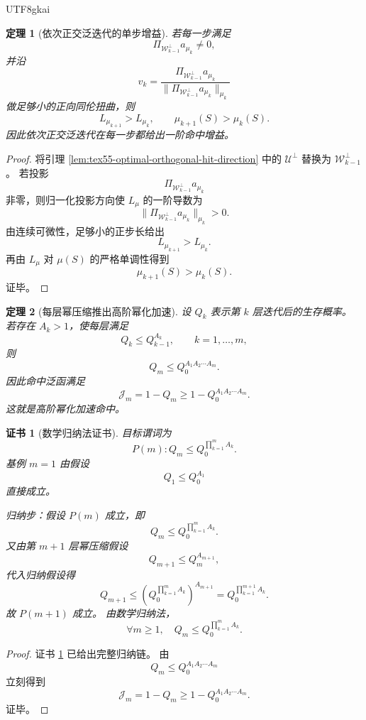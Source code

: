 \documentclass[12pt]{article}
\newtheorem{theorem}{定理}[section]
\newtheorem{Certificate}{证书}[section]
\begin{document}
\begin{CJK*}{UTF8}{gkai}
\begin{theorem}[依次正交泛迭代的单步增益]
\label{thm:tex55-sequential-orthogonal-gain}
若每一步满足
\[
  \Pi_{\mathcal W_{k-1}^\perp}a_{\mu_k}\neq0,
\]
并沿
\[
  v_k
  =
  \frac{
  \Pi_{\mathcal W_{k-1}^\perp}a_{\mu_k}
  }{
  \lVert\Pi_{\mathcal W_{k-1}^\perp}a_{\mu_k}\rVert_{\mu_k}
  }
\]
做足够小的正向同伦扭曲，则
\[
  L_{\mu_{k+1}}>L_{\mu_k},
  \qquad
  \mu_{k+1}(S)>\mu_k(S).
\]
因此依次正交泛迭代在每一步都给出一阶命中增益。
\end{theorem}

\begin{proof}
将引理 \ref{lem:tex55-optimal-orthogonal-hit-direction} 中的
\(\mathcal U^\perp\) 替换为 \(\mathcal W_{k-1}^\perp\)。
若投影
\[
  \Pi_{\mathcal W_{k-1}^\perp}a_{\mu_k}
\]
非零，则归一化投影方向使 \(L_\mu\) 的一阶导数为
\[
  \lVert\Pi_{\mathcal W_{k-1}^\perp}a_{\mu_k}\rVert_{\mu_k}>0.
\]
由连续可微性，足够小的正步长给出
\[
  L_{\mu_{k+1}}>L_{\mu_k}.
\]
再由 \(L_\mu\) 对 \(\mu(S)\) 的严格单调性得到
\[
  \mu_{k+1}(S)>\mu_k(S).
\]
证毕。
\end{proof}

\begin{theorem}[每层幂压缩推出高阶幂化加速]
\label{thm:tex55-higher-order-power-acceleration}
设 \(Q_k\) 表示第 \(k\) 层迭代后的生存概率。
若存在 \(A_k>1\)，使每层满足
\[
  Q_k\le Q_{k-1}^{A_k},
  \qquad
  k=1,\ldots,m,
\]
则
\[
  \boxed{
  Q_m
  \le
  Q_0^{A_1A_2\cdots A_m}.
  }
\]
因此命中泛函满足
\[
  \boxed{
  \mathcal J_m
  =
  1-Q_m
  \ge
  1-Q_0^{A_1A_2\cdots A_m}.
  }
\]
这就是高阶幂化加速命中。
\end{theorem}

\begin{Certificate}[数学归纳法证书]
\label{cert:tex55-higher-order-power-acceleration}
目标谓词为
\[
  P(m):
  Q_m\le Q_0^{\prod_{k=1}^{m}A_k}.
\]
基例 \(m=1\) 由假设
\[
  Q_1\le Q_0^{A_1}
\]
直接成立。

归纳步：假设 \(P(m)\) 成立，即
\[
  Q_m\le Q_0^{\prod_{k=1}^{m}A_k}.
\]
又由第 \(m+1\) 层幂压缩假设
\[
  Q_{m+1}\le Q_m^{A_{m+1}},
\]
代入归纳假设得
\[
  Q_{m+1}
  \le
  \left(
  Q_0^{\prod_{k=1}^{m}A_k}
  \right)^{A_{m+1}}
  =
  Q_0^{\prod_{k=1}^{m+1}A_k}.
\]
故 \(P(m+1)\) 成立。
由数学归纳法，
\[
  \forall m\ge1,\quad
  Q_m\le Q_0^{\prod_{k=1}^{m}A_k}.
\]
\end{Certificate}

\begin{proof}
证书 \ref{cert:tex55-higher-order-power-acceleration} 已给出完整归纳链。
由
\[
  Q_m\le Q_0^{A_1A_2\cdots A_m}
\]
立刻得到
\[
  \mathcal J_m=1-Q_m
  \ge
  1-Q_0^{A_1A_2\cdots A_m}.
\]
证毕。
\end{proof}


\end{CJK*}
\end{document}
